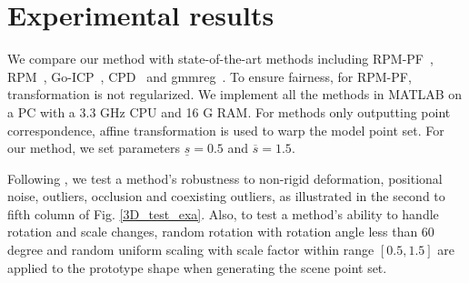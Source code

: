 \documentclass[11pt,bezier,]{article}
\begin{document}
\section{Experimental results}
We compare our method with state-of-the-art methods including
RPM-PF~\cite{RPM_PF_aff}, RPM~\cite{RPM_TPS}, 
Go-ICP~\cite{Go_ICP}, CPD~\cite{CPD} and gmmreg~\cite{kernel_Gaussian_journal}.
To ensure fairness, for RPM-PF,
transformation is not regularized.
We implement all the  methods in MATLAB on a
PC with a 3.3 GHz CPU and 16 G RAM. For methods only
outputting point correspondence, affine transformation is used
to warp the model point set. For our method, we set parameters
$\underline{s}=0.5$ and $\overline{s}=1.5$.




Following \cite{GM_relax_label,RPM_model_occlude},
we test a method's robustness to non-rigid deformation, positional noise,
outliers, occlusion and coexisting outliers,
as illustrated in the second to fifth column of Fig. \ref{3D_test_exa}.
Also, to test a method's ability to handle rotation and scale changes,
random rotation with rotation angle less than 60 degree 
and random uniform scaling with scale factor within range $[0.5 ,1.5]$
are applied to the prototype shape 
when generating the scene point set.
\end{document}
